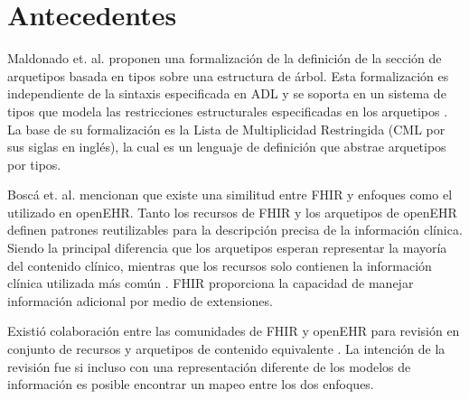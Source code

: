 \section{Antecedentes}

Maldonado et. al. proponen una formalización de la definición de la sección de arquetipos basada en tipos sobre una estructura de árbol. Esta formalización es independiente de la sintaxis especificada en ADL y se soporta en un sistema de tipos que modela las restricciones estructurales especificadas en los arquetipos \cite{Maldonado09}. La base de su formalización es la Lista de Multiplicidad Restringida (CML por sus siglas en inglés), la cual es un lenguaje de definición que abstrae arquetipos por tipos.

Boscá et. al. mencionan que existe una similitud entre FHIR y enfoques como el utilizado en openEHR. Tanto los recursos de FHIR y los arquetipos de openEHR definen patrones reutilizables para la descripción precisa de la información clínica. Siendo la principal diferencia que los arquetipos esperan representar la mayoría del contenido clínico, mientras que los recursos solo contienen la información clínica utilizada más común \cite{Bosca15}. FHIR proporciona la capacidad de manejar información adicional por medio de extensiones.

Existió colaboración entre las comunidades de FHIR y openEHR para revisión en conjunto de recursos y arquetipos de contenido equivalente \cite{Collaboration}. La intención de la revisión fue si incluso con una representación diferente de los modelos de información es posible encontrar un mapeo entre los dos enfoques.
